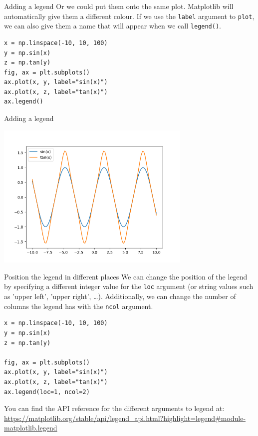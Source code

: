 \documentclass[10pt]{beamer}
\begin{document}
\begin{frame}[label={sec:org59939c9},fragile]{Adding a legend}
 Or we could put them onto the same plot. Matplotlib will automatically give them
a different colour. If we use the \texttt{label} argument to \texttt{plot}, we can also give them
a name that will appear when we call \texttt{legend()}.

\begin{verbatim}
x = np.linspace(-10, 10, 100)
y = np.sin(x)
z = np.tan(y)
fig, ax = plt.subplots()
ax.plot(x, y, label="sin(x)")
ax.plot(x, z, label="tan(x)")
ax.legend()
\end{verbatim}
\end{frame}

\begin{frame}[label={sec:org96597f6}]{Adding a legend}
\begin{center}
\includegraphics[width=0.7\textwidth]{images/legend.png}
\end{center}
\end{frame}

\begin{frame}[label={sec:org5af5f5c},fragile]{Position the legend in different places}
 We can change the position of the legend by specifying a different integer value
for the \texttt{loc} argument (or string values such as 'upper left', 'upper right',
\ldots{}). Additionally, we can change the number of columns the legend has with the
\texttt{ncol} argument.

\begin{verbatim}
x = np.linspace(-10, 10, 100)
y = np.sin(x)
z = np.tan(y)

fig, ax = plt.subplots()
ax.plot(x, y, label="sin(x)")
ax.plot(x, z, label="tan(x)")
ax.legend(loc=1, ncol=2)
\end{verbatim}

You can find the API reference for the different arguments to legend at: \url{https://matplotlib.org/stable/api/legend\_api.html?highlight=legend\#module-matplotlib.legend}
\end{frame}
\end{document}
